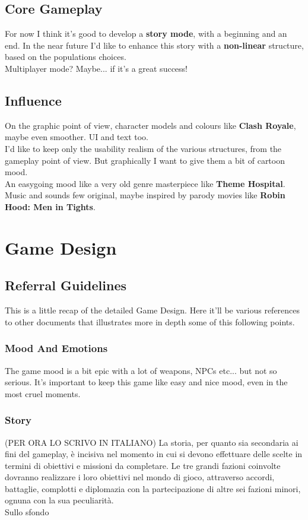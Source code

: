 \documentclass[a4paper]{scrreprt}
\begin{document}
\section{Core Gameplay}
For now I think it's good to develop a \textbf{story mode}, with a beginning and an end. In the near future I'd like to enhance this story with a \textbf{non-linear} structure, based on the populations choices.\\
Multiplayer mode? Maybe... if it's a great success!

\section{Influence}
On the graphic point of view, character models and colours like \textbf{Clash Royale}, maybe even smoother. UI and text too.\\
I'd like to keep only the usability realism of the various structures, from the gameplay point of view. But graphically I want to give them a bit of cartoon mood.\\
An easygoing mood like a very old genre masterpiece like \textbf{Theme Hospital}.\\
Music and sounds few original, maybe inspired by parody movies like \textbf{Robin Hood: Men in Tights}.


\chapter{Game Design} 

\section{Referral Guidelines}
This is a little recap of the detailed Game Design. Here it'll be various references to other documents that illustrates more in depth some of this following points. 

\subsection{Mood And Emotions}
The game mood is a bit epic with a lot of weapons, NPCs etc... but not so serious. It's important to keep this game like easy and nice mood, even in the most cruel moments.

\subsection{Story}
(PER ORA LO SCRIVO IN ITALIANO) La storia, per quanto sia secondaria ai fini del gameplay, è incisiva nel momento in cui si devono effettuare delle scelte in termini di obiettivi e missioni da completare. Le tre grandi fazioni coinvolte dovranno realizzare i loro obiettivi nel mondo di gioco, attraverso accordi, battaglie, complotti e diplomazia con la partecipazione di altre sei fazioni minori, ognuna con la sua peculiarità.\\
Sullo sfondo
\end{document}
